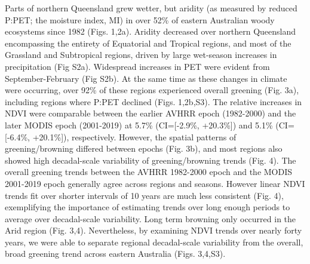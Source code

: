 \documentclass[gc, manuscript]{copernicus}
\begin{document}
Parts of northern Queensland grew wetter, but aridity (as measured by
reduced P:PET; the moisture index, MI) in over 52\% of eastern
Australian woody ecosystems since 1982 (Figs. 1,2a). Aridity decreased
over northern Queensland encompassing the entirety of Equatorial and
Tropical regions, and most of the Grassland and Subtropical regions,
driven by large wet-season increases in precipitation (Fig S2a).
Widespread increases in PET were evident from September-February (Fig
S2b). At the same time as these changes in climate were occurring, over
92\% of these regions experienced overall greening (Fig. 3a), including
regions where P:PET declined (Figs. 1,2b,S3). The relative increases in
NDVI were comparable between the earlier AVHRR epoch (1982-2000) and the
later MODIS epoch (2001-2019) at 5.7\% (CI={[}-2.9\%, +20.3\%{]}) and
5.1\% (CI={[}-6.4\%, +20.1\%{]}), respectively. However, the spatial
patterns of greening/browning differed between epochs (Fig. 3b), and
most regions also showed high decadal-scale variability of
greening/browning trends (Fig. 4). The overall greening trends between
the AVHRR 1982-2000 epoch and the MODIS 2001-2019 epoch generally agree
across regions and seasons. However linear NDVI trends fit over shorter
intervals of 10 years are much less consistent (Fig. 4), exemplifying
the importance of estimating trends over long enough periods to average
over decadal-scale variability. Long term browning only occurred in the
Arid region (Fig. 3,4). Nevertheless, by examining NDVI trends over
nearly forty years, we were able to separate regional decadal-scale
variability from the overall, broad greening trend across eastern
Australia (Figs. 3,4,S3). \clearpage
\end{document}
